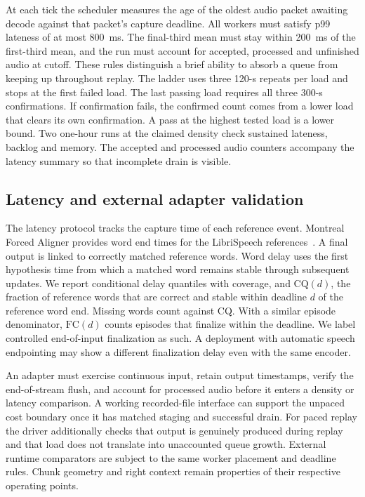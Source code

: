 \documentclass[conference]{IEEEtran}
\begin{document}
At each tick the scheduler measures the age of the oldest audio packet
awaiting decode against that packet's capture deadline. All workers must
satisfy p99 lateness of at most 800~ms. The final-third mean must stay within
200~ms of the first-third mean, and the run must account for accepted,
processed and unfinished audio at cutoff. These rules distinguish a brief
ability to absorb a queue from keeping up throughout replay. The ladder
uses three 120-s repeats per load and stops at the first failed load.
The last passing load requires all three 300-s confirmations. If confirmation
fails, the confirmed count comes from a lower load that clears its own
confirmation. A pass at the highest tested load is a lower bound. Two
one-hour runs at the claimed density check sustained lateness, backlog and
memory. The accepted and processed audio counters accompany the latency
summary so that incomplete drain is visible.

\subsection{Latency and external adapter validation}

The latency protocol tracks the capture time of each reference event.
Montreal Forced Aligner provides word end times for the
LibriSpeech references~\cite{mcauliffe2017mfa}. A final output is linked
to correctly matched reference words. Word delay uses the first hypothesis
time from which a matched word remains stable through subsequent updates.
We report conditional delay quantiles with coverage, and
\(\mathrm{CQ}(d)\), the fraction of reference words that are correct and
stable within deadline \(d\) of the reference word end. Missing words count
against CQ. With a similar episode denominator, \(\mathrm{FC}(d)\) counts
episodes that finalize within the deadline. We label controlled end-of-input
finalization as such. A deployment with automatic speech endpointing may
show a different finalization delay even with the same encoder.

An adapter must exercise continuous input, retain output timestamps, verify
the end-of-stream flush, and account for processed audio before it enters a
density or latency comparison. A working recorded-file interface can support
the unpaced cost boundary once it has matched staging and successful
drain. For paced replay the driver additionally checks that output is genuinely
produced during replay and that load does not translate into unaccounted
queue growth. External runtime comparators are subject to the same worker
placement and deadline rules. Chunk geometry and right context remain
properties of their respective operating points.
\end{document}
